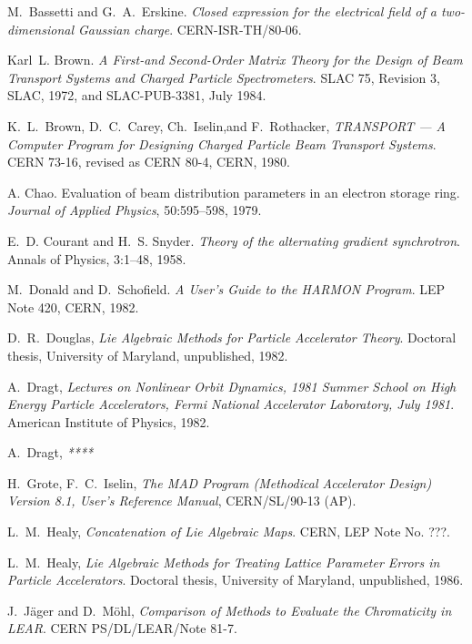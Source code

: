 \begin{thebibliography}{99}

M.~Bassetti and G.~A.~Erskine.
{\it Closed expression for the electrical field of a two-dimensional
Gaussian charge}.
CERN-ISR-TH/80-06.

Karl~L. Brown.
{\it A First-and Second-Order Matrix Theory for the Design
  of Beam Transport Systems and Charged Particle Spectrometers}.
SLAC 75, Revision 3, SLAC, 1972, and SLAC-PUB-3381, July 1984.

K.~L.~Brown, D.~C.~Carey, Ch.~Iselin,and  F.~Rothacker,
{\it TRANSPORT --- A Computer Program for Designing Charged
  Particle Beam Transport Systems}.
CERN 73-16, revised as CERN 80-4, CERN, 1980.

A. Chao.
Evaluation of beam distribution parameters in an electron storage
ring.
{\it Journal of Applied Physics}, 50:595--598, 1979.
 
E.~D. Courant and H.~S. Snyder.
{\it Theory of the alternating gradient synchrotron}.
Annals of Physics, 3:1--48, 1958.
 
M.~Donald and D.~Schofield.
{\it A User's Guide to the HARMON Program}.
LEP Note 420, CERN, 1982.

D.~R.~Douglas,
{\it Lie Algebraic Methods for Particle Accelerator Theory}.
Doctoral thesis, University of Maryland, unpublished, 1982.
 
A.~Dragt,
{\it Lectures on Nonlinear Orbit Dynamics, 1981 Summer School on High
  Energy Particle Accelerators, Fermi National Accelerator Laboratory,
  July 1981}.
American Institute of Physics, 1982.

A.~Dragt,
{\it *****}

H.~Grote, F.~C.~Iselin,
{\it The MAD Program (Methodical Accelerator Design) Version 8.1,
User's Reference Manual},
CERN/SL/90-13 (AP).

L.~M.~Healy,
{\it Concatenation of Lie Algebraic Maps}.
CERN, LEP Note No. ???.

L.~M.~Healy,
{\it Lie Algebraic Methods for Treating Lattice Parameter Errors in
Particle Accelerators}.
Doctoral thesis, University of Maryland, unpublished, 1986.

J.~J\"ager and D.~M\"ohl,
{\it Comparison of Methods to Evaluate the Chromaticity in LEAR}.
CERN PS/DL/LEAR/Note 81-7.


\end{thebibliography}
